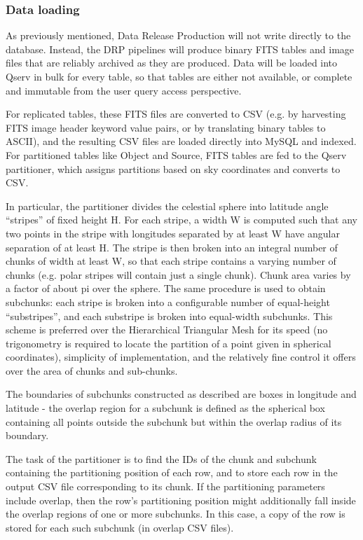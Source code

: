 \documentclass[DM,lsstdraft,toc]{lsstdoc}
\begin{document}
\subsubsection{Data loading}\label{data-loading}

As previously mentioned, Data Release Production will not write directly
to the database. Instead, the DRP pipelines will produce binary FITS
tables and image files that are reliably archived as they are produced.
Data will be loaded into Qserv in bulk for every table, so that tables
are either not available, or complete and immutable from the user query
access perspective.

For replicated tables, these FITS files are converted to CSV (e.g. by
harvesting FITS image header keyword value pairs, or by translating
binary tables to ASCII), and the resulting CSV files are loaded directly
into MySQL and indexed. For partitioned tables like Object and Source,
FITS tables are fed to the Qserv partitioner, which assigns partitions
based on sky coordinates and converts to CSV.

In particular, the partitioner divides the celestial sphere into
latitude angle ``stripes'' of fixed height H. For each stripe, a width W
is computed such that any two points in the stripe with longitudes
separated by at least W have angular separation of at least H. The
stripe is then broken into an integral number of chunks of width at
least W, so that each stripe contains a varying number of chunks (e.g.
polar stripes will contain just a single chunk). Chunk area varies by a
factor of about pi over the sphere. The same procedure is used to obtain
subchunks: each stripe is broken into a configurable number of
equal-height ``substripes'', and each substripe is broken into
equal-width subchunks. This scheme is preferred over the Hierarchical
Triangular Mesh for its speed (no trigonometry is required to locate the
partition of a point given in spherical coordinates), simplicity of
implementation, and the relatively fine control it offers over the area
of chunks and sub-chunks.

The boundaries of subchunks constructed as described are boxes in
longitude and latitude - the overlap region for a subchunk is defined as
the spherical box containing all points outside the subchunk but within
the overlap radius of its boundary.

The task of the partitioner is to find the IDs of the chunk and subchunk
containing the partitioning position of each row, and to store each row
in the output CSV file corresponding to its chunk. If the partitioning
parameters include overlap, then the row's partitioning position might
additionally fall inside the overlap regions of one or more subchunks.
In this case, a copy of the row is stored for each such subchunk (in
overlap CSV files).
\end{document}
